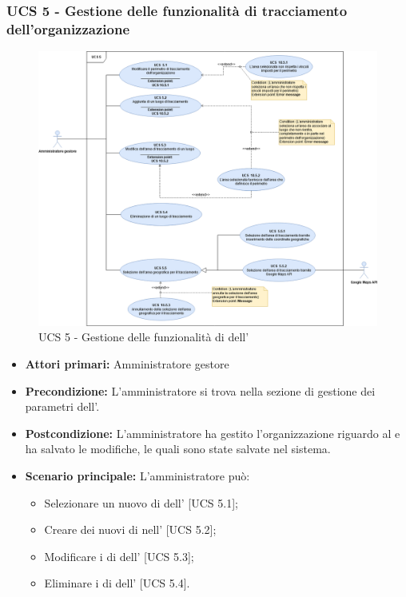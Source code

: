 \newpage
\subsubsection{UCS 5 - Gestione delle funzionalità di tracciamento dell'organizzazione}%
\begin{figure}[h]
	\centering
    \includegraphics[scale=0.40]{Sezioni/UseCase/Immagini/UCS5.png}
    \caption{UCS 5 - Gestione delle funzionalità di  dell'}
\end{figure}
\begin{itemize}
    \item \textbf{Attori primari:} Amministratore gestore
    \item \textbf{Precondizione:} L'amministratore si trova nella sezione di gestione dei parametri dell'.
    \item \textbf{Postcondizione:} L'amministratore ha gestito l'organizzazione riguardo al  e ha salvato le modifiche, le quali sono state salvate nel sistema.
    \item \textbf{Scenario principale:} L'amministratore può:
    \begin{itemize}    
        \item Selezionare un nuovo  di  dell' [UCS 5.1];
        \item Creare dei nuovi  di  nell' [UCS 5.2];
        \item Modificare i  di  dell' [UCS 5.3];
        \item Eliminare i  di  dell' [UCS 5.4].
    \end{itemize}
\end{itemize}

